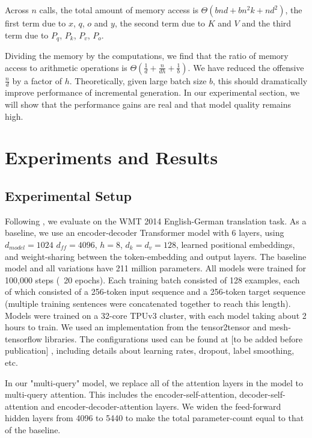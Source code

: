 Across $n$ calls, the total amount of memory access is $\Theta(bnd + bn^2k + nd^2)$, the first term due to $x$, $q$, $o$ and $y$, the second term due to $K$ and $V$ and the third term due to $P_q$, $P_k$, $P_v$, $P_o$.

Dividing the memory by the computations, we find that the ratio of memory access to arithmetic operations is $\Theta(\frac{1}{d} + \frac{n}{dh} + \frac{1}{b})$.  We have reduced the offensive $\frac{n}{d}$ by a factor of $h$.  Theoretically, given large batch size $b$, this should dramatically improve performance of incremental generation.  In our experimental section, we will show that the performance gains are real and that model quality remains high.

\section{Experiments and Results}

\subsection{Experimental Setup}

Following \citep{Vas17}, we evaluate on the WMT 2014 English-German translation task.  As a baseline, we use an encoder-decoder Transformer model with 6 layers, using $d_{model}=1024$ $d_{ff}=4096$, $h=8$, $d_k=d_v=128$, learned positional embeddings, and weight-sharing between the token-embedding and output layers.  The baseline model and all variations have 211 million parameters.  All models were trained for 100,000 steps (~20 epochs).  Each training batch consisted of 128 examples, each of which consisted of a 256-token input sequence and a 256-token target sequence (multiple training sentences were concatenated together to reach this length).   Models were trained on a 32-core TPUv3 cluster, with each model taking about 2 hours to train.  We used an implementation from the tensor2tensor and mesh-tensorflow libraries.  The configurations used can be found at [to be added before publication]  , including details about learning rates, dropout, label smoothing, etc.

In our "multi-query" model, we replace all of the attention layers in the model to multi-query attention.  This includes the encoder-self-attention, decoder-self-attention and encoder-decoder-attention layers.  We widen the feed-forward hidden layers from 4096 to 5440 to make the total parameter-count equal to that of the baseline.

